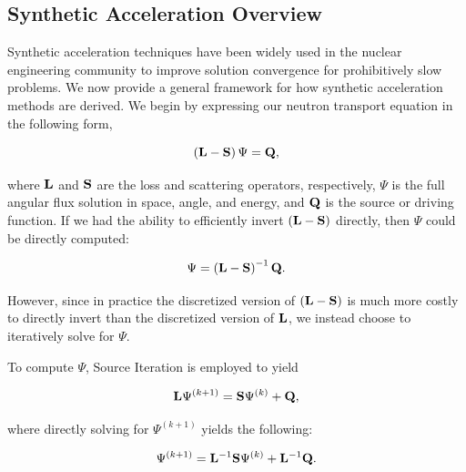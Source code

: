 \subsection{Synthetic Acceleration Overview}
\label{sec::DSA_Introduction_SA}

Synthetic acceleration techniques have been widely used in the nuclear engineering community to improve solution convergence for prohibitively slow problems. We now provide a general framework for how synthetic acceleration methods are derived. We begin by expressing our neutron transport equation in the following form,

\begin{equation}
\label{eq::DSA_simple_trans_eq_w_ops}
\left(  {\bf L} - {\bf S}  \right) \Psi = {\bf Q} ,
\end{equation}

\noindent where ${\bf L}$ and ${\bf S}$ are the loss and scattering operators, respectively, $\Psi$ is the full angular flux solution in space, angle, and energy, and ${\bf Q}$ is the source or driving function. If we had the ability to efficiently invert $\left(  {\bf L} - {\bf S}  \right)$ directly, then $\Psi$ could be directly computed:

\begin{equation}
\label{eq::DSA_simple_trans_eq_w_ops_inverted}
\Psi = \left(  {\bf L} - {\bf S}  \right)^{-1} {\bf Q} .
\end{equation}

\noindent However, since in practice the discretized version of $\left(  {\bf L} - {\bf S}  \right)$ is much more costly to directly invert than the discretized version of ${\bf L}$, we instead choose to iteratively solve for $\Psi$.

To compute $\Psi$, Source Iteration is employed to yield

\begin{equation}
\label{eq::DSA_simple_trans_eq_w_ops_iterates}
 {\bf L} \Psi^{(k+1)} ={\bf S}  \Psi^{(k)} + {\bf Q} ,
\end{equation}

\noindent where directly solving for $\Psi^{(k+1)}$ yields the following:

\begin{equation}
\label{eq::DSA_simple_trans_eq_sol_w_ops_iterates}
 \Psi^{(k+1)} =  {\bf L}^{-1} {\bf S}  \Psi^{(k)} +  {\bf L}^{-1} {\bf Q} .
\end{equation}

